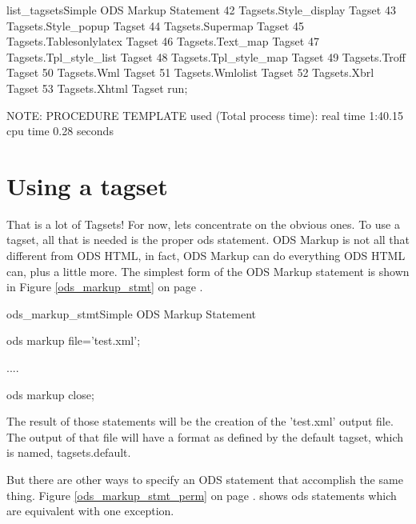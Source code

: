 \begin{fvcode}{list_tagsets}{Simple ODS Markup Statement}
                42     Tagsets.Style_display            Tagset
                43     Tagsets.Style_popup              Tagset
                44     Tagsets.Supermap                 Tagset
                45     Tagsets.Tablesonlylatex          Tagset
                46     Tagsets.Text_map                 Tagset
                47     Tagsets.Tpl_style_list           Tagset
                48     Tagsets.Tpl_style_map            Tagset
                49     Tagsets.Troff                    Tagset
                50     Tagsets.Wml                      Tagset
                51     Tagsets.Wmlolist                 Tagset
                52     Tagsets.Xbrl                     Tagset
                53     Tagsets.Xhtml                    Tagset
       run;

NOTE: PROCEDURE TEMPLATE used (Total process time):
      real time           1:40.15
      cpu time            0.28 seconds
      
\end{fvcode}

\section{Using a tagset}
That is a lot of Tagsets!  For now, lets concentrate on the obvious
ones.  
To use a tagset, all that is needed is the proper ods statement.
ODS Markup is not all that different from ODS HTML, in fact, ODS
Markup can do everything ODS HTML can, plus a little more.
The simplest form of the ODS Markup statement is shown 
in Figure \ref{ods_markup_stmt} on page \pageref{ods_markup_stmt}.

\begin{fvcode}{ods_markup_stmt}{Simple ODS Markup Statement}
   
    ods markup file='test.xml';

    ....

    ods markup close;

\end{fvcode}


The result of those statements will be the creation of the 'test.xml' output
file.  The output of that file will have a format as defined by the default
tagset, which is named, tagsets.default.

But there are other ways to specify an ODS statement that accomplish the same thing.
Figure \ref{ods_markup_stmt_perm} on page \pageref{ods_markup_stmt_perm}.
shows ods statements which are equivalent with one exception.

